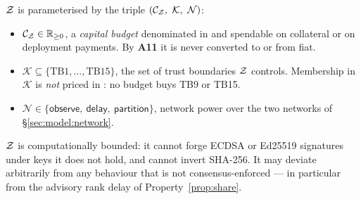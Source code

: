 \begin{definition}
\label{def:adversary}
$\mathcal{Z}$ is parameterised by the triple $(\advbudget,\ \mathcal{K},\ \mathcal{N})$:
\begin{itemize}
  \item $\mathcal{C}_{\mathcal{Z}} \in \mathbb{R}_{\ge 0}$, a \emph{capital budget} denominated in \flux{} and
        spendable on collateral or on deployment payments. By \textbf{A11} it is never converted to
        or from fiat.
  \item $\mathcal{K} \subseteq \{\mathrm{TB1},\dots,\mathrm{TB15}\}$, the set of trust boundaries
        $\mathcal{Z}$ controls. Membership in $\mathcal{K}$ is \emph{not} priced in \flux{}: no budget buys
        TB9 or TB15.
  \item $\mathcal{N} \in \{\textsf{observe},\ \textsf{delay},\ \textsf{partition}\}$, network power
        over the two networks of \S\ref{sec:model:network}.
\end{itemize}
$\mathcal{Z}$ is computationally bounded: it cannot forge ECDSA or Ed25519 signatures under keys it does not
hold, and cannot invert SHA-256. It may deviate arbitrarily from any behaviour that is not
consensus-enforced --- in particular from the advisory rank delay of Property~\ref{prop:share}.
\end{definition}

